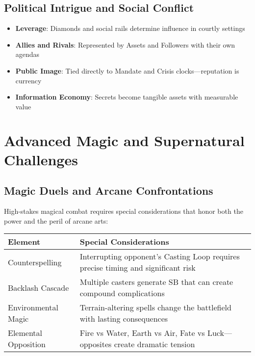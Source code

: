 \subsection*{Political Intrigue and Social Conflict}

\begin{itemize}
    \item \textbf{Leverage}: Diamonds and social rails determine influence in courtly settings
    \item \textbf{Allies and Rivals}: Represented by Assets and Followers with their own agendas
    \item \textbf{Public Image}: Tied directly to Mandate and Crisis clocks—reputation is currency
    \item \textbf{Information Economy}: Secrets become tangible assets with measurable value
\end{itemize}

\section*{Advanced Magic and Supernatural Challenges}

\subsection*{Magic Duels and Arcane Confrontations}

High-stakes magical combat requires special considerations that honor both the power and the peril of arcane arts:

\begin{fatebox}
\begin{tabularx}{\textwidth}{lX}
\toprule
\textbf{Element} & \textbf{Special Considerations} \\
\midrule
Counterspelling & Interrupting opponent's Casting Loop requires precise timing and significant risk \\
Backlash Cascade & Multiple casters generate SB that can create compound complications \\
Environmental Magic & Terrain-altering spells change the battlefield with lasting consequences \\
Elemental Opposition & Fire vs Water, Earth vs Air, Fate vs Luck—opposites create dramatic tension \\
\bottomrule
\end{tabularx}
\end{fatebox}

